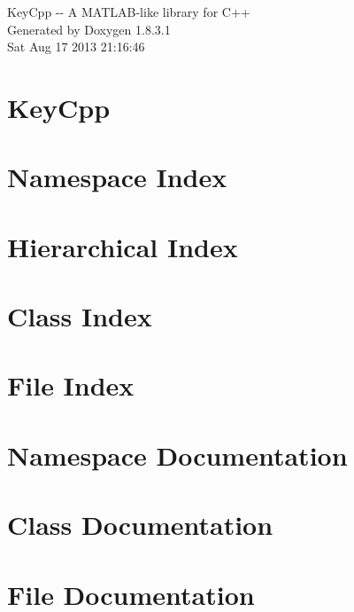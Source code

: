 \documentclass{book}
\begin{document}
\hypersetup{pageanchor=false,citecolor=blue}
\begin{titlepage}
\vspace*{7cm}
\begin{center}
{\Large Key\-Cpp -\/-\/ A M\-A\-T\-L\-A\-B-\/like library for C++ }\\
\vspace*{1cm}
{\large Generated by Doxygen 1.8.3.1}\\
\vspace*{0.5cm}
{\small Sat Aug 17 2013 21:16:46}\\
\end{center}
\end{titlepage}
\clearemptydoublepage
{}
\tableofcontents
\clearemptydoublepage
{}
\hypersetup{pageanchor=true,citecolor=blue}
\chapter{Key\-Cpp}
\label{index}\hypertarget{index}{}
\chapter{Namespace Index}

\chapter{Hierarchical Index}

\chapter{Class Index}

\chapter{File Index}

\chapter{Namespace Documentation}

\chapter{Class Documentation}





















\chapter{File Documentation}

\printindex
\end{document}
